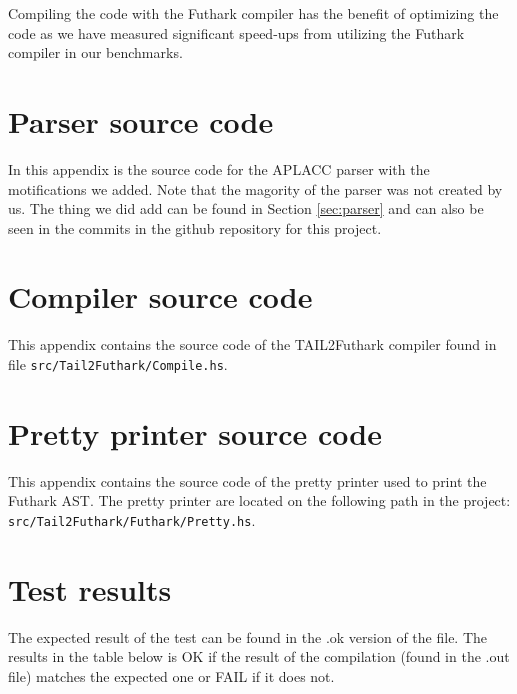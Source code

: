 \documentclass[11pt]{article}
\begin{document}
Compiling the code with the Futhark compiler has the benefit of optimizing the code as we have measured significant speed-ups from utilizing the Futhark compiler in our benchmarks.


{} 


\newpage

\appendix
\section{Parser source code}
\label{app:parser}

In this appendix is the source code for the APLACC parser \cite{APLACC} with the motifications we added. Note that the magority of the parser was not created by us. The thing we did add can be found in Section \ref{sec:parser} and can also be seen in the commits in the github repository for this project. 

\lstset{breaklines=true}



\newpage

\section{Compiler source code}
\label{app:impl}

This appendix contains the source code of the TAIL2Futhark compiler found in file {\tt src/Tail2Futhark/Compile.hs}. 


\newpage

\section{Pretty printer source code}
\label{app:pretty}

This appendix contains the source code of the pretty printer used to print the Futhark AST. The pretty printer are located on the following path in the project: {\tt src/Tail2Futhark/Futhark/Pretty.hs}. 



\newpage

\section{Test results}
\label{app:testresults}
The expected result of the test can be found in the .ok version of the file. The results in the table below is OK if the result of the compilation (found in the .out file) matches the expected one or FAIL if it does not.
\end{document}
